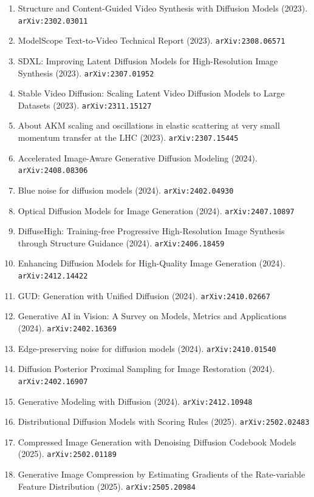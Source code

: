 \documentclass[11pt]{article}
\begin{document}
\begin{enumerate}
  \item Structure and Content-Guided Video Synthesis with Diffusion Models (2023). \texttt{arXiv:2302.03011}
  \item ModelScope Text-to-Video Technical Report (2023). \texttt{arXiv:2308.06571}
  \item SDXL: Improving Latent Diffusion Models for High-Resolution Image
  Synthesis (2023). \texttt{arXiv:2307.01952}
  \item Stable Video Diffusion: Scaling Latent Video Diffusion Models to Large
  Datasets (2023). \texttt{arXiv:2311.15127}
  \item About AKM scaling and oscillations in elastic scattering at very small
  momentum transfer at the LHC (2023). \texttt{arXiv:2307.15445}
  \item Accelerated Image-Aware Generative Diffusion Modeling (2024). \texttt{arXiv:2408.08306}
  \item Blue noise for diffusion models (2024). \texttt{arXiv:2402.04930}
  \item Optical Diffusion Models for Image Generation (2024). \texttt{arXiv:2407.10897}
  \item DiffuseHigh: Training-free Progressive High-Resolution Image Synthesis
  through Structure Guidance (2024). \texttt{arXiv:2406.18459}
  \item Enhancing Diffusion Models for High-Quality Image Generation (2024). \texttt{arXiv:2412.14422}
  \item GUD: Generation with Unified Diffusion (2024). \texttt{arXiv:2410.02667}
  \item Generative AI in Vision: A Survey on Models, Metrics and Applications (2024). \texttt{arXiv:2402.16369}
  \item Edge-preserving noise for diffusion models (2024). \texttt{arXiv:2410.01540}
  \item Diffusion Posterior Proximal Sampling for Image Restoration (2024). \texttt{arXiv:2402.16907}
  \item Generative Modeling with Diffusion (2024). \texttt{arXiv:2412.10948}
  \item Distributional Diffusion Models with Scoring Rules (2025). \texttt{arXiv:2502.02483}
  \item Compressed Image Generation with Denoising Diffusion Codebook Models (2025). \texttt{arXiv:2502.01189}
  \item Generative Image Compression by Estimating Gradients of the Rate-variable Feature Distribution (2025). \texttt{arXiv:2505.20984}

\end{enumerate}
\end{document}
